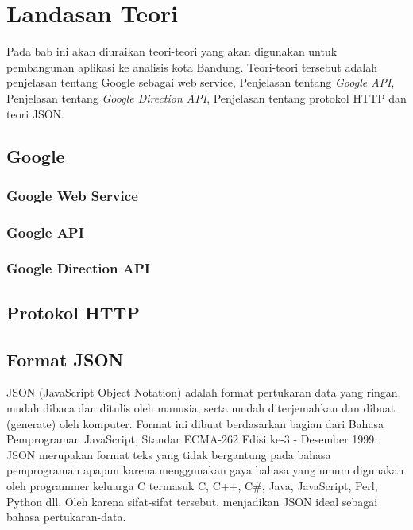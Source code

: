 \chapter{Landasan Teori}
\label{chap:teori}

Pada bab ini akan diuraikan teori-teori yang akan digunakan untuk pembangunan aplikasi ke analisis kota Bandung. Teori-teori tersebut adalah penjelasan tentang Google sebagai web service, Penjelasan tentang \textit{Google API}, Penjelasan tentang \textit{Google Direction API}, Penjelasan tentang protokol HTTP dan teori JSON.

\section{Google}
\label{sec:google}

\subsection{Google Web Service}
\label{subsec:webservicegoogle}

\subsection{Google API}
\label{subsec:googleapi}

\subsection{Google Direction API}
\label{subsec:googledirapi}

\section{Protokol HTTP}
\label{sec:prothttp} 


\section{Format JSON}
\label{sec:json}

JSON (JavaScript Object Notation) adalah format pertukaran data yang ringan, mudah dibaca dan ditulis oleh manusia, serta mudah diterjemahkan dan dibuat (generate) oleh komputer. Format ini dibuat berdasarkan bagian dari Bahasa Pemprograman JavaScript, Standar ECMA-262 Edisi ke-3 - Desember 1999. JSON merupakan format teks yang tidak bergantung pada bahasa pemprograman apapun karena menggunakan gaya bahasa yang umum digunakan oleh programmer keluarga C termasuk C, C++, C#, Java, JavaScript, Perl, Python dll. Oleh karena sifat-sifat tersebut, menjadikan JSON ideal sebagai bahasa pertukaran-data.

